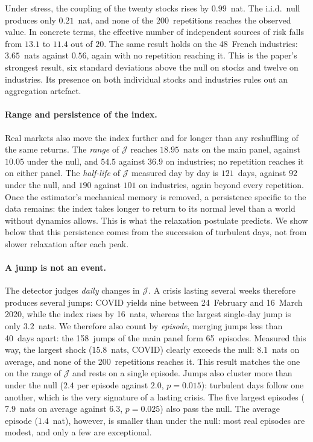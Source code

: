 \documentclass[11pt]{article}
\theoremstyle{definition}
\newcommand{\JJ}{\mathcal{J}}
\begin{document}
Under stress, the coupling of the twenty stocks rises by $0.99$~nat. The
i.i.d.\ null produces only $0.21$~nat, and none of the 200~repetitions reaches
the observed value. In concrete terms, the effective number of independent
sources of risk falls from $13.1$ to $11.4$ out of $20$. The same result holds
on the 48~French industries: $3.65$~nats against $0.56$, again with no
repetition reaching it. This is the paper's strongest result, six standard
deviations above the null on stocks and twelve on industries. Its presence on
both individual stocks and industries rules out an aggregation artefact.

\paragraph{Range and persistence of the index.} Real markets also move the
index further and for longer than any reshuffling of the same returns. The
\emph{range} of $\JJ$ reaches $18.95$~nats on the main panel, against $10.05$
under the null, and $54.5$ against $36.9$ on industries; no repetition reaches
it on either panel. The \emph{half-life} of $\JJ$ measured day by day is
$121$~days, against $92$ under the null, and $190$ against $101$ on
industries, again beyond every repetition. Once the estimator's mechanical
memory is removed, a persistence specific to the data remains: the index takes
longer to return to its normal level than a world without dynamics allows.
This is what the relaxation postulate predicts. We show below that this
persistence comes from the succession of turbulent days, not from slower
relaxation after each peak.

\paragraph{A jump is not an event.} The detector judges \emph{daily} changes
in $\JJ$. A crisis lasting several weeks therefore produces several jumps:
COVID yields nine between 24~February and 16~March 2020, while the index rises
by 16~nats, whereas the largest single-day jump is only $3.2$~nats. We
therefore also count by \emph{episode}, merging jumps less than 40~days apart:
the 158~jumps of the main panel form 65~episodes. Measured this way, the
largest shock ($15.8$~nats, COVID) clearly exceeds the null: $8.1$~nats on
average, and none of the 200~repetitions reaches it. This result matches the
one on the range of $\JJ$ and rests on a single episode. Jumps also cluster
more than under the null ($2.4$ per episode against $2.0$, $p=0.015$):
turbulent days follow one another, which is the very signature of a lasting
crisis. The five largest episodes ($7.9$~nats on average against $6.3$,
$p=0.025$) also pass the null. The average episode ($1.4$~nat), however, is
smaller than under the null: most real episodes are modest, and only a few are
exceptional.
\end{document}
